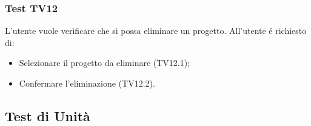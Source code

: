 \subsubsection{Test TV12}
L'utente vuole verificare che si possa eliminare un progetto. \newline
All'utente é richiesto di:
\begin{itemize}
	\item Selezionare il progetto da eliminare (TV12.1);
	\item Confermare l'eliminazione (TV12.2).
\end{itemize}

\subsection{Test di Unità}

